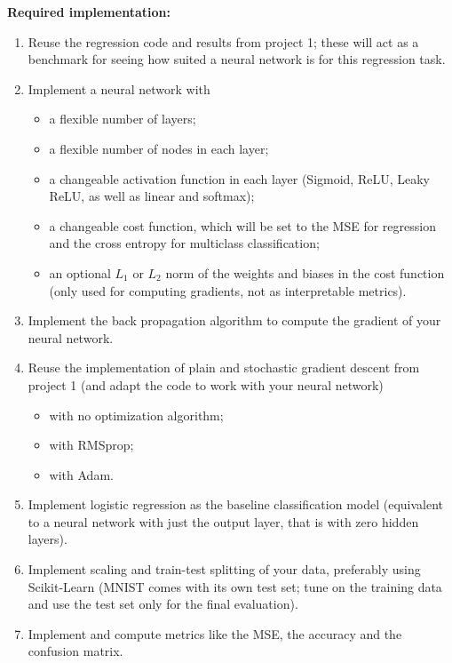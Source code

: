 \documentclass[11pt,a4paper]{article}
\begin{document}
\textbf{Required implementation:}
\begin{enumerate}[nosep]
  \item Reuse the regression code and results from project 1; these will act
        as a benchmark for seeing how suited a neural network is for this
        regression task.
  \item Implement a neural network with
  \begin{itemize}[nosep]
    \item a flexible number of layers;
    \item a flexible number of nodes in each layer;
    \item a changeable activation function in each layer (Sigmoid, ReLU,
          Leaky ReLU, as well as linear and softmax);
    \item a changeable cost function, which will be set to the MSE for
          regression and the cross entropy for multiclass classification;
    \item an optional $L_1$ or $L_2$ norm of the weights and biases in the
          cost function (only used for computing gradients, not as
          interpretable metrics).
  \end{itemize}
  \item Implement the back propagation algorithm to compute the gradient of
        your neural network.
  \item Reuse the implementation of plain and stochastic gradient descent
        from project 1 (and adapt the code to work with your neural
        network)
  \begin{itemize}[nosep]
    \item with no optimization algorithm;
    \item with RMSprop;
    \item with Adam.
  \end{itemize}
  \item Implement logistic regression as the baseline classification model
        (equivalent to a neural network with just the output layer, that is
        with zero hidden layers).
  \item Implement scaling and train-test splitting of your data, preferably
        using Scikit-Learn (MNIST comes with its own test set; tune on the
        training data and use the test set only for the final evaluation).
  \item Implement and compute metrics like the MSE, the accuracy and the
        confusion matrix.
\end{enumerate}
\end{document}
